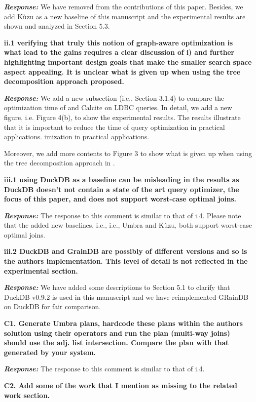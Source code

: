 \textbf{\textit{Response: }}
We have removed \rgmapping from the contributions of this paper.
Besides, we add K\`uzu as a new baseline of this manuscript and the experimental results are shown and analyzed in Section 5.3.


\textbf{
ii.1 verifying that truly this notion of graph-aware optimization is what lead to the gains requires a clear discussion of i) and further highlighting important design goals that make the smaller search space aspect appealing.
It is unclear what is given up when using the tree decomposition approach proposed.}

\textbf{\textit{Response: }}
We add a new subsection (i.e., Section 3.1.4) to compare the optimization time of \name and Calcite on LDBC queries.
In detail, we add a new figure, i.e. Figure 4(b), to show the experimental results.
The results illustrate that it is important to reduce the time of query optimization in practical applications. 
imization in practical applications. 

Moreover, we add more contents to Figure 3 to show what is given up when using the tree decomposition approach in \name.


\textbf{
iii.1 using DuckDB as a baseline can be misleading in the results
as DuckDB doesn't not contain a state of the art query optimizer, the focus of this paper, and does not support worst-case optimal joins.}

\textbf{\textit{Response: }}
The response to this comment is similar to that of i.4.
Please note that the added new baselines, i.e., i.e., Umbra and K\`uzu, both support worst-case optimal joins.


\textbf{
iii.2 DuckDB and GrainDB are possibly of different versions and so is the authors implementation. This level of detail is not reflected in the experimental section.}

\textbf{\textit{Response: }}
We have added some descriptions to Section 5.1 to clarify that DuckDB v0.9.2 is used in this manuscript and we have reimplemented GRainDB on DuckDB for fair comparison.


\textbf{
C1. Generate Umbra plans, hardcode these plans within the authors solution using their operators and run the plan (multi-way joins) should use the adj. list intersection. Compare the plan with that generated by your system. }

\textbf{\textit{Response: }}
The response to this comment is similar to that of i.4.

\textbf{
C2. Add some of the work that I mention as missing to the related work section.}


